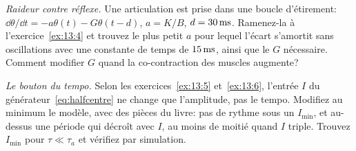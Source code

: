 \begin{exercise}[\lvlB]
\label{ex:13:7}
\emph{Raideur contre réflexe.} Une articulation est prise dans une boucle d'étirement: $\dd\theta/\dd t=-a\theta(t)-G\theta(t-d)$, $a=K/B$, $d=30\,\text{ms}$. Ramenez-la à l'exercice~\ref{ex:13:4} et trouvez le plus petit $a$ pour lequel l'écart s'amortit sans oscillations avec une constante de temps de $15\,\text{ms}$, ainsi que le $G$ nécessaire. Comment modifier $G$ quand la co-contraction des muscles augmente?
\end{exercise}

\begin{exercise}[\lvlC]
\label{ex:13:8}
\emph{Le bouton du tempo.} Selon les exercices~\ref{ex:13:5} et~\ref{ex:13:6}, l'entrée $I$ du générateur~\eqref{eq:halfcentre} ne change que l'amplitude, pas le tempo. Modifiez au minimum le modèle, avec des pièces du livre: pas de rythme sous un $I_{\min}$, et au-dessus une période qui décroît avec $I$, au moins de moitié quand $I$ triple. Trouvez $I_{\min}$ pour $\tau\ll\tau_a$ et vérifiez par simulation.
\end{exercise}
